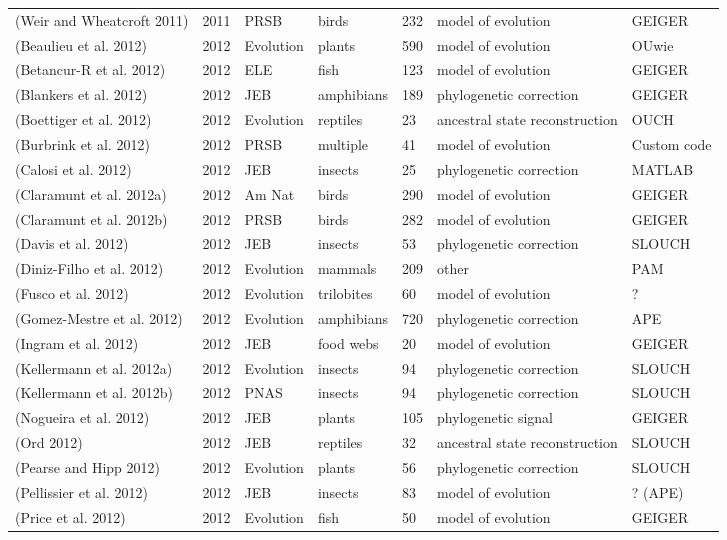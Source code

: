 \begin{longtable}{p{6cm}llllll}
(Weir and Wheatcroft 2011)	&	2011	&	PRSB	&	birds	&	232	&	model of evolution	&	GEIGER	\\
(Beaulieu et al. 2012)	&	2012	&	Evolution	&	plants	&	590	&	model of evolution	&	OUwie	\\
(Betancur-R et al. 2012)	&	2012	&	ELE	&	fish	&	123	&	model of evolution	&	GEIGER	\\
(Blankers et al. 2012)	&	2012	&	JEB	&	amphibians	&	189	&	phylogenetic correction	&	GEIGER	\\
(Boettiger et al. 2012)	&	2012	&	Evolution	&	reptiles	&	23	&	ancestral state reconstruction	&	OUCH	\\
(Burbrink et al. 2012)	&	2012	&	PRSB	&	multiple	&	41	&	model of evolution	&	Custom code	\\
(Calosi et al. 2012)	&	2012	&	JEB	&	insects	&	25	&	phylogenetic correction	&	MATLAB	\\
(Claramunt et al. 2012a)	&	2012	&	Am Nat	&	birds	&	290	&	model of evolution	&	GEIGER	\\
(Claramunt et al. 2012b)	&	2012	&	PRSB	&	birds	&	282	&	model of evolution	&	GEIGER	\\
(Davis et al. 2012)	&	2012	&	JEB	&	insects	&	53	&	phylogenetic correction	&	SLOUCH	\\
(Diniz-Filho et al. 2012)	&	2012	&	Evolution	&	mammals	&	209	&	other	&	PAM	\\
(Fusco et al. 2012)	&	2012	&	Evolution	&	trilobites	&	60	&	model of evolution	&	?	\\
(Gomez-Mestre et al. 2012)	&	2012	&	Evolution	&	amphibians	&	720	&	phylogenetic correction	&	APE	\\
(Ingram et al. 2012)	&	2012	&	JEB	&	food webs	&	20	&	model of evolution	&	GEIGER	\\
(Kellermann et al. 2012a)	&	2012	&	Evolution	&	insects	&	94	&	phylogenetic correction	&	SLOUCH	\\
(Kellermann et al. 2012b)	&	2012	&	PNAS	&	insects	&	94	&	phylogenetic correction	&	SLOUCH	\\
(Nogueira et al. 2012)	&	2012	&	JEB	&	plants	&	105	&	phylogenetic signal	&	GEIGER	\\
(Ord 2012)	&	2012	&	JEB	&	reptiles	&	32	&	ancestral state reconstruction	&	SLOUCH	\\
(Pearse and Hipp 2012)	&	2012	&	Evolution	&	plants	&	56	&	phylogenetic correction	&	SLOUCH	\\
(Pellissier et al. 2012)	&	2012	&	JEB	&	insects	&	83	&	model of evolution	&	? (APE)	\\
(Price et al. 2012)	&	2012	&	Evolution	&	fish	&	50	&	model of evolution	&	GEIGER	\\

\end{longtable}
